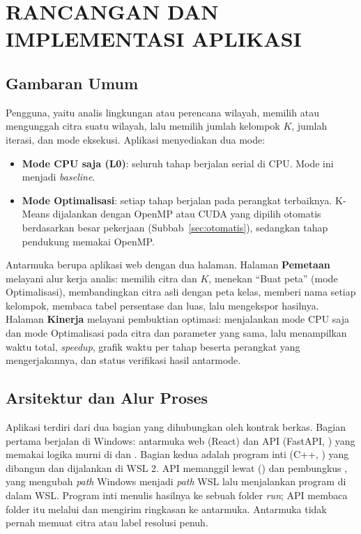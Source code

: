 \chapter{RANCANGAN DAN IMPLEMENTASI APLIKASI}

\section{Gambaran Umum}
Pengguna, yaitu analis lingkungan atau perencana wilayah, memilih atau mengunggah citra suatu wilayah, lalu memilih jumlah kelompok $K$, jumlah iterasi, dan mode eksekusi. Aplikasi menyediakan dua mode:
\begin{itemize}
    \item \textbf{Mode CPU saja (L0)}: seluruh tahap berjalan serial di CPU. Mode ini menjadi \emph{baseline}.
    \item \textbf{Mode Optimalisasi}: setiap tahap berjalan pada perangkat terbaiknya. K-Means dijalankan dengan OpenMP atau CUDA yang dipilih otomatis berdasarkan besar pekerjaan (Subbab~\ref{sec:otomatis}), sedangkan tahap pendukung memakai OpenMP.
\end{itemize}

Antarmuka berupa aplikasi web dengan dua halaman. Halaman \textbf{Pemetaan} melayani alur kerja analis: memilih citra dan $K$, menekan ``Buat peta'' (mode Optimalisasi), membandingkan citra asli dengan peta kelas, memberi nama setiap kelompok, membaca tabel persentase dan luas, lalu mengekspor hasilnya. Halaman \textbf{Kinerja} melayani pembuktian optimasi: menjalankan mode CPU saja dan mode Optimalisasi pada citra dan parameter yang sama, lalu menampilkan waktu total, \emph{speedup}, grafik waktu per tahap beserta perangkat yang mengerjakannya, dan status verifikasi hasil antarmode.

\section{Arsitektur dan Alur Proses}
\label{sec:arsitektur}
Aplikasi terdiri dari dua bagian yang dihubungkan oleh kontrak berkas. Bagian pertama berjalan di Windows: antarmuka web (React) dan API (FastAPI, ) yang memakai logika murni di  dan . Bagian kedua adalah program inti  (C++, ) yang dibangun dan dijalankan di WSL 2. API memanggil  lewat  () dan pembungkus , yang mengubah \emph{path} Windows menjadi \emph{path} WSL lalu menjalankan program di dalam WSL. Program inti menulis hasilnya ke sebuah folder \emph{run}; API membaca folder itu melalui  dan mengirim ringkasan ke antarmuka. Antarmuka tidak pernah memuat citra atau label resolusi penuh.

